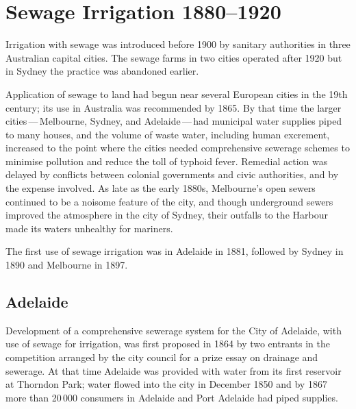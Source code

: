 
\chapter{Sewage Irrigation 1880--1920}

\label{ch:sewage}

\setcounter{endnote}{0}

Irrigation with sewage was introduced before 1900 by sanitary
authorities in three Australian capital cities.  The sewage farms in
two cities operated after 1920 but in Sydney the practice was
abandoned earlier.

Application of sewage to land had begun near several European cities
in the 19th century; its use in Australia was recommended by 1865.  By
that time the larger cities\,---\,Melbourne, Sydney, and
Adelaide\,---\,had municipal water supplies piped to many houses, and
the volume of waste water, including human excrement, increased to the
point where the cities needed comprehensive sewerage schemes to
minimise pollution and reduce the toll of typhoid fever.  Remedial
action was delayed by conflicts between colonial governments and civic
authorities, and by the expense involved.  As late as the early 1880s,
Melbourne's open sewers continued to be a noisome feature of the city,
and though underground sewers improved the atmosphere in the city of
Sydney, their outfalls to the Harbour made its waters unhealthy for
mariners.

The first use of sewage irrigation was in Adelaide in 1881, followed
by Sydney in 1890 and Melbourne in 1897.

\section*{Adelaide}

Development of a comprehensive sewerage system for the City of
Adelaide, with use of sewage for irrigation, was first proposed in
1864 by two entrants in the competition arranged by the city council
for a prize essay on drainage and sewerage.  At that
time Adelaide was provided with water from its first
reservoir at Thorndon Park;
 water flowed into the city in December
1850 and by 1867 more than 20\,000 consumers in Adelaide and Port
Adelaide had piped supplies.

